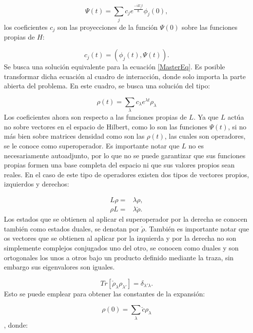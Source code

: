 \documentclass[a4paper,10pt]{report}
\begin{document}
\begin{equation}
\Psi(t) = \sum_j c_j e^{\frac{-iE_jt}{\hbar}}\phi_j(0),
\end{equation}los coeficientes $c_j$ son las proyecciones de la función $\Psi(0)$ sobre las funciones propias de $H$:

\begin{equation}
c_j(t)= (\phi_j(t),\Psi(t)).
\end{equation} Se busca una solución equivalente para la ecuación \eqref{MasterEq}. Es posible transformar dicha ecuación al cuadro de interacción, donde solo importa la parte abierta del problema. En este cuadro, se busca una solución del tipo:

\begin{equation}
\rho(t) = \sum_{\lambda} c_{\lambda} e^{\lambda t}\rho_{\lambda} 
\end{equation} Los coeficientes ahora son respecto a las funciones propias de $L$. Ya que $L$ actúa no sobre vectores en el espacio de Hilbert, como lo son las funciones $\Psi(t)$, si no más bien sobre matrices densidad como son las $\rho(t)$, las cuales son operadores, se le conoce como superoperador. Es importante notar que $L$ no es necesariamente autoadjunto, por lo que no se puede garantizar que sus funciones propias formen una base completa del espacio ni que sus valores propios sean reales. En el caso de este tipo de operadores existen dos tipos de vectores propios\cite{BarnettSD}, izquierdos y derechos:

\begin{align*}
L\rho =& \lambda \rho, \\
\rho L =& \lambda \check{\rho}.
\end{align*} Los estados que se obtienen al aplicar el superoperador por la derecha se conocen también como estados duales, se denotan por $\check{\rho}$. También es importante notar que os vectores que se obtienen al aplicar por la izquierda y por la derecha no son simplemente complejos conjugados uno del otro, se conocen como duales y son ortogonales los unos a otros bajo un producto definido mediante la traza\cite{EnglertDB}, sin embargo sus eigenvalores son iguales.

\begin{equation}
Tr[\check{\rho}_\lambda \rho_{\lambda'}] = \delta_{\lambda'\lambda}.
\end{equation} Esto se puede emplear para obtener las constantes de la expansión:

\begin{equation}
\rho(0) = \sum_{\lambda} \check{c} \rho_{\lambda}
\end{equation}, donde:
\end{document}
